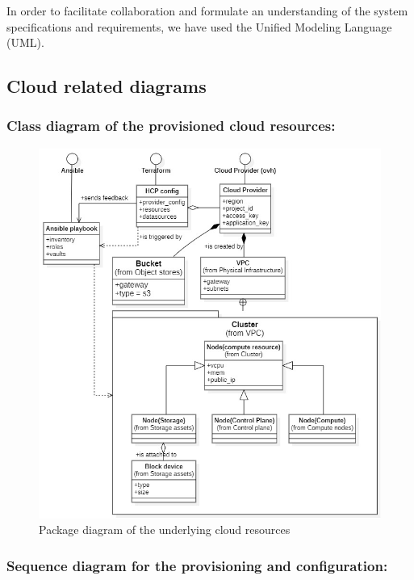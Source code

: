 In order to facilitate collaboration and formulate an understanding of the system specifications and requirements, we have used the Unified Modeling Language (UML). 

\subsection{Cloud related diagrams }

\subsubsection{Class diagram of the provisioned cloud resources:}

\begin{figure}[H]\centering
\includegraphics[width=1.0\textwidth,angle=00]{assets/f2.jpg}
\caption{Package diagram of the underlying cloud resources}
\label{fig:f2}
\end{figure}

\subsubsection{Sequence diagram for the provisioning and configuration:}

